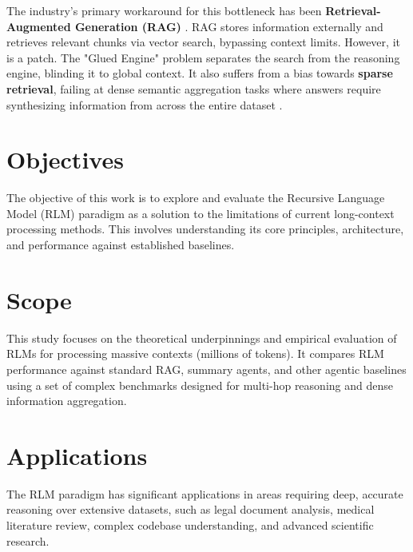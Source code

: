 The industry's primary workaround for this bottleneck has been \textbf{Retrieval-Augmented Generation (RAG)} \cite{lewis2020}. RAG stores information externally and retrieves relevant chunks via vector search, bypassing context limits. However, it is a patch. The "Glued Engine" problem separates the search from the reasoning engine, blinding it to global context. It also suffers from a bias towards \textbf{sparse retrieval}, failing at dense semantic aggregation tasks where answers require synthesizing information from across the entire dataset \cite{khattab2021}.



\section{Objectives}
The objective of this work is to explore and evaluate the Recursive Language Model (RLM) paradigm as a solution to the limitations of current long-context processing methods. This involves understanding its core principles, architecture, and performance against established baselines.

\section{Scope}
This study focuses on the theoretical underpinnings and empirical evaluation of RLMs for processing massive contexts (millions of tokens). It compares RLM performance against standard RAG, summary agents, and other agentic baselines using a set of complex benchmarks designed for multi-hop reasoning and dense information aggregation.

\section{Applications}
The RLM paradigm has significant applications in areas requiring deep, accurate reasoning over extensive datasets, such as legal document analysis, medical literature review, complex codebase understanding, and advanced scientific research.

